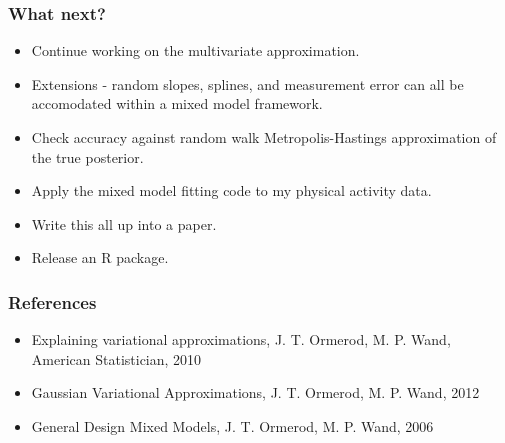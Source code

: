 \documentclass{beamer}
\begin{document}
\begin{frame}
\frametitle{What next?}
\begin{itemize}
\item Continue working on the multivariate approximation.
\item Extensions - random slopes, splines, and measurement error can all be 
accomodated within a mixed model framework.
\item Check accuracy against random walk Metropolis-Hastings approximation
of the true posterior.
\item Apply the mixed model fitting code to my physical activity data.
\item Write this all up into a paper.
\item Release an R package.
\end{itemize}
\end{frame}

\begin{frame}
\frametitle{References}
\begin{itemize}
\item Explaining variational approximations, J. T. Ormerod, M. P. Wand, American Statistician, 2010
\item Gaussian Variational Approximations, J. T. Ormerod, M. P. Wand, 2012
\item General Design Mixed Models, J. T. Ormerod, M. P. Wand, 2006
\end{itemize}
\end{frame}
\end{document}
